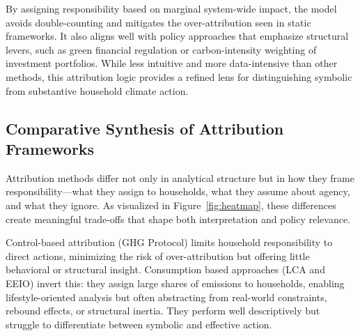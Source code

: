 \documentclass[12pt,a4paper]{article}%
\begin{document}
By assigning responsibility based on marginal system-wide impact, the model avoids double-counting and mitigates the over-attribution seen in static frameworks. It also aligns well with policy approaches that emphasize structural levers, such as green financial regulation or carbon-intensity weighting of investment portfolios. While less intuitive and more data-intensive than other methods, this attribution logic provides a refined lens for distinguishing symbolic from substantive household climate action.

\subsection{Comparative Synthesis of Attribution Frameworks}

Attribution methods differ not only in analytical structure but in how they frame responsibility—what they assign to households, what they assume about agency, and what they ignore. As visualized in Figure~\ref{fig:heatmap}, these differences create meaningful trade-offs that shape both interpretation and policy relevance.

Control-based attribution (GHG Protocol) limits household responsibility to direct actions, minimizing the risk of over-attribution but offering little behavioral or structural insight. Consumption based approaches (LCA and EEIO) invert this: they assign large shares of emissions to households, enabling lifestyle-oriented analysis but often abstracting from real-world constraints, rebound effects, or structural inertia. They perform well descriptively but struggle to differentiate between symbolic and effective action.
\end{document}
